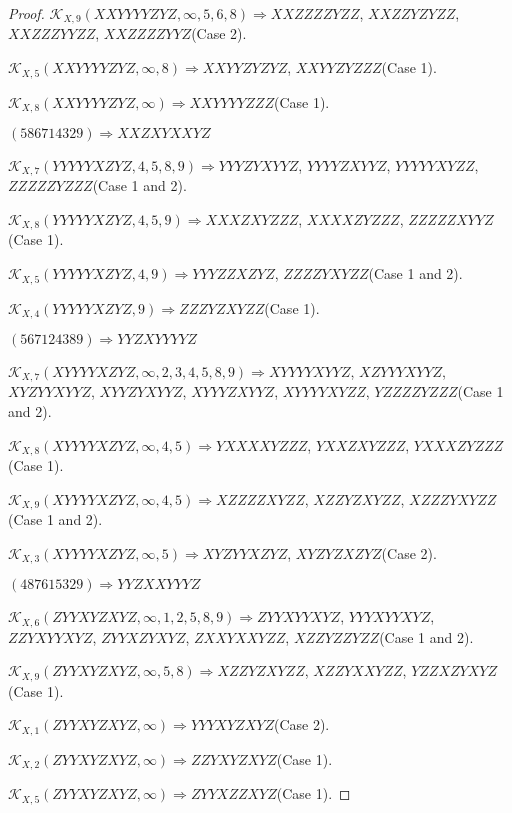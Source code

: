 \documentclass[12pt]{article}
\theoremstyle{plain}
\theoremstyle{definition}
\theoremstyle{remark}
\newcommand{\fancy}[1]{\mathcal{#1}}
\def\K{\fancy{K}}
\begin{document}
\begin{proof}
	$\K_{X,9}(XXYYYYZYZ,\infty,5, 6, 8)\Rightarrow $$XXZZZZYZZ$, $XXZZYZYZZ$, $XXZZZYYZZ$, $XXZZZZYYZ$(Case 2).
	
	$\K_{X,5}(XXYYYYZYZ,\infty,8)\Rightarrow $$XXYYZYZYZ$, $XXYYZYZZZ$(Case 1).
	
	$\K_{X,8}(XXYYYYZYZ,\infty)\Rightarrow $$XXYYYYZZZ$(Case 1).
	
	
	
	$(5 8 6 7 1 4 3 2 9)\Rightarrow XXZXYXXYZ$
	
	
	
	$\K_{X,7}(YYYYYXZYZ,4, 5, 8, 9)\Rightarrow $$YYYZYXYYZ$, $YYYYZXYYZ$, $YYYYYXYZZ$, $ZZZZZYZZZ$(Case 1 and 2).
	
	$\K_{X,8}(YYYYYXZYZ,4, 5, 9)\Rightarrow $$XXXZXYZZZ$, $XXXXZYZZZ$, $ZZZZZXYYZ$(Case 1).
	
	$\K_{X,5}(YYYYYXZYZ,4, 9)\Rightarrow $$YYYZZXZYZ$, $ZZZZYXYZZ$(Case 1 and 2).
	
	$\K_{X,4}(YYYYYXZYZ,9)\Rightarrow $$ZZZYZXYZZ$(Case 1).
	
	
	
	$(5 6 7 1 2 4 3 8 9)\Rightarrow YYZXYYYYZ$
	
	
	
	$\K_{X,7}(XYYYYXZYZ,\infty,2, 3, 4, 5, 8, 9)\Rightarrow $$XYYYYXYYZ$, $XZYYYXYYZ$, $XYZYYXYYZ$, $XYYZYXYYZ$, $XYYYZXYYZ$, $XYYYYXYZZ$, $YZZZZYZZZ$(Case 1 and 2).
	
	$\K_{X,8}(XYYYYXZYZ,\infty,4, 5)\Rightarrow $$YXXXXYZZZ$, $YXXZXYZZZ$, $YXXXZYZZZ$(Case 1).
	
	$\K_{X,9}(XYYYYXZYZ,\infty,4, 5)\Rightarrow $$XZZZZXYZZ$, $XZZYZXYZZ$, $XZZZYXYZZ$(Case 1 and 2).
	
	$\K_{X,3}(XYYYYXZYZ,\infty,5)\Rightarrow $$XYZYYXZYZ$, $XYZYZXZYZ$(Case 2).
	
	
	
	$(4 8 7 6 1 5 3 2 9)\Rightarrow YYZXXYYYZ$
	
	
	
	$\K_{X,6}(ZYYXYZXYZ,\infty,1, 2, 5, 8, 9)\Rightarrow $$ZYYXYYXYZ$, $YYYXYYXYZ$, $ZZYXYYXYZ$, $ZYYXZYXYZ$, $ZXXYXXYZZ$, $XZZYZZYZZ$(Case 1 and 2).
	
	$\K_{X,9}(ZYYXYZXYZ,\infty,5, 8)\Rightarrow $$XZZYZXYZZ$, $XZZYXXYZZ$, $YZZXZYXYZ$(Case 1).
	
	$\K_{X,1}(ZYYXYZXYZ,\infty)\Rightarrow $$YYYXYZXYZ$(Case 2).
	
	$\K_{X,2}(ZYYXYZXYZ,\infty)\Rightarrow $$ZZYXYZXYZ$(Case 1).
	
	$\K_{X,5}(ZYYXYZXYZ,\infty)\Rightarrow $$ZYYXZZXYZ$(Case 1).
	

\end{proof}
\end{document}
